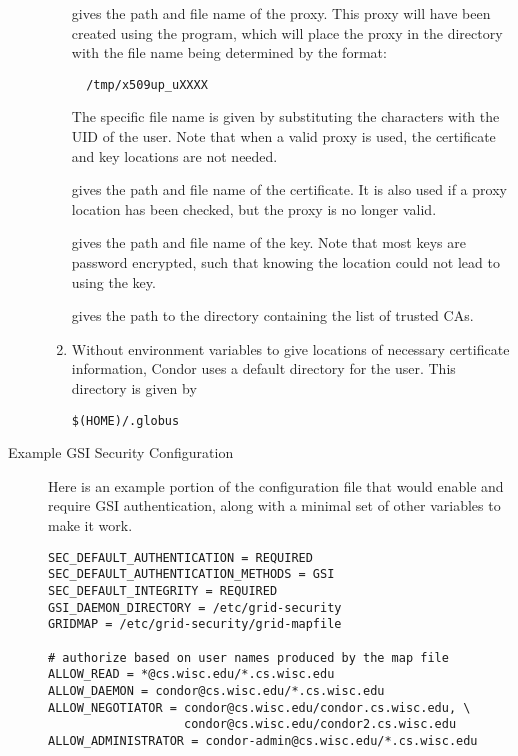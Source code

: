 \begin{description}
\begin{enumerate}
   gives the path and file name of the proxy.
  This proxy will have been created using the  program, 
  which will place the proxy in the 
  directory with the file name being determined by the format:
  \begin{verbatim}
  /tmp/x509up_uXXXX
  \end{verbatim}
  The specific file name is given by substituting the \verb@XXXX@
  characters with the UID of the user.
  Note that when a valid proxy is used, the certificate and key locations
  are not needed. 

   gives the path and file name of the
  certificate. It is also used if a proxy location has been checked,
  but the proxy is no longer valid.  

   gives the path and file name of the
  key. Note that most keys are password encrypted, such that knowing
  the location could not lead to using the key. 

   gives the path to the directory 
  containing the list of trusted CAs. 

\item
Without environment variables to give locations of necessary
certificate information,
Condor uses a default directory for the user.
This directory is given by 
\begin{verbatim}
$(HOME)/.globus
\end{verbatim}
\end{enumerate}

\item[Example GSI Security Configuration]

Here is an example portion of the configuration file that would
enable and require GSI authentication,
along with a minimal set of other variables to make it work. 

\footnotesize
\begin{verbatim}
SEC_DEFAULT_AUTHENTICATION = REQUIRED
SEC_DEFAULT_AUTHENTICATION_METHODS = GSI
SEC_DEFAULT_INTEGRITY = REQUIRED
GSI_DAEMON_DIRECTORY = /etc/grid-security
GRIDMAP = /etc/grid-security/grid-mapfile

# authorize based on user names produced by the map file
ALLOW_READ = *@cs.wisc.edu/*.cs.wisc.edu
ALLOW_DAEMON = condor@cs.wisc.edu/*.cs.wisc.edu
ALLOW_NEGOTIATOR = condor@cs.wisc.edu/condor.cs.wisc.edu, \
                   condor@cs.wisc.edu/condor2.cs.wisc.edu
ALLOW_ADMINISTRATOR = condor-admin@cs.wisc.edu/*.cs.wisc.edu


\end{verbatim}
\end{description}
